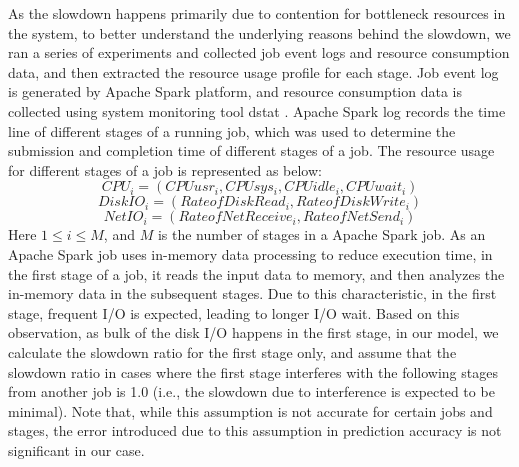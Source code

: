 \noindent
As the slowdown happens primarily due to contention for bottleneck resources in the system, to better understand the underlying reasons behind the slowdown, we ran a series of experiments and collected job event logs and resource consumption data, and then extracted the resource usage profile for each stage. Job event log is generated by Apache Spark platform, and resource consumption data is collected using system monitoring tool dstat \cite{dstat}. Apache Spark log records the time line of different stages of a running job, which was used to determine the submission and completion time of different stages of a job. The resource usage for different stages of a job is represented as below: 
\begin{equation}
\label{cpu}
CPU_i 
= (CPUusr_i, CPUsys_i, CPUidle_i, CPUwait_i) 
\end{equation}
\begin{equation}
\label{diskio}
DiskIO_i = (RateofDiskRead_i, RateofDiskWrite_i)
\end{equation}
\begin{equation}
\label{netio}
NetIO_i = (RateofNetReceive_i, RateofNetSend_i)
\end{equation}
Here $1 \leq i \leq M$, and $M$ is the number of stages in a Apache Spark job.
\noindent 
As an Apache Spark job uses in-memory data processing to reduce execution time, in the first stage of a job, it reads the input data to memory, and then analyzes the in-memory data in the subsequent stages. Due to this characteristic, in the first stage, frequent I/O is expected, leading to longer I/O wait. Based on this observation, as bulk of the disk I/O happens in the first stage, in our model, we calculate the slowdown ratio for the first stage only, and assume that the slowdown ratio in cases where the first stage interferes with the following stages from another job is 1.0 (i.e., the slowdown due to interference is expected to be minimal). Note that, while this assumption is not accurate for certain jobs and stages, the error introduced due to this assumption in prediction accuracy is not significant in our case. 



